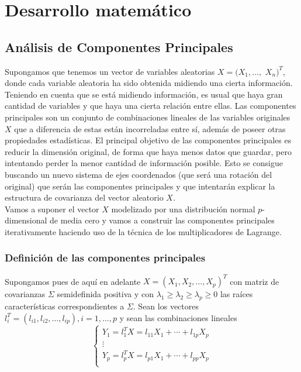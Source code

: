 %
%


\chapter{Desarrollo matemático}

\section{Análisis de Componentes Principales}

Supongamos que tenemos un vector de variables aleatorias $X =  (X_1, \dots ,$ $X_n)^T$, donde cada variable aleatoria ha sido obtenida midiendo una cierta información. Teniendo en cuenta que se está midiendo información, es usual que haya gran cantidad de variables y que haya una cierta relación entre ellas. Las componentes principales son un conjunto de combinaciones lineales de las variables originales $X$ que a diferencia de estas están incorreladas entre sí, además de poseer otras propiedades estadísticas. El principal objetivo de las componentes principales es reducir la dimensión original, de forma que haya menos datos que guardar, pero intentando perder la menor cantidad de información posible. Esto se consigue buscando un nuevo sistema de ejes coordenados (que será una rotación del original) que serán las componentes principales y que intentarán explicar la estructura de covarianza del vector aleatorio $X$.\\

Vamos a suponer el vector $X$ modelizado por una distribución normal $p$-dimensional de media cero y vamos a construir las componentes principales iterativamente haciendo uso de la técnica de los multiplicadores de Lagrange.\\

\subsection{Definición de las componentes principales}

Supongamos pues de aquí en adelante $X = (X_1, X_2, \dots, X_p)^T$ con matriz de covarianzas $\Sigma$ semidefinida positiva y con $\lambda_1 \geq \lambda_2 \geq \lambda_p \geq 0$ las raíces características correspondientes a $\Sigma$. Sean los vectores $l_i^T = (l_{i1}, l_{i2}, \dots, l_{ip}), i=1,\dots,p$ y sean las combinaciones lineales 
\begin{equation*}
  \left\lbrace
  \begin{array}{l}
     Y_1 = l_1^TX = l_{11}X_1 + \cdots + l_{1p}X_p \\
     \vdots \\
     Y_p = l_p^TX = l_{p1}X_1 + \cdots + l_{pp}X_p \\
  \end{array}
  \right.
\end{equation*}

